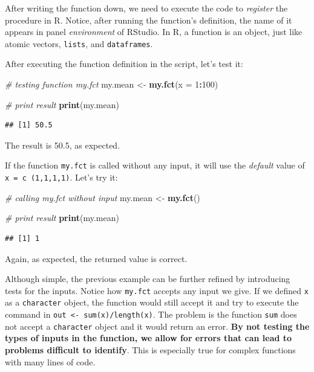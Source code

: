 \documentclass[11pt,]{book}
\newenvironment{Shaded}{\begin{snugshade}}{\end{snugshade}}
\newcommand{\KeywordTok}[1]{\textcolor[rgb]{0.27,0.27,0.27}{\textbf{#1}}}
\newcommand{\DataTypeTok}[1]{\textcolor[rgb]{0.27,0.27,0.27}{#1}}
\newcommand{\DecValTok}[1]{\textcolor[rgb]{0.06,0.06,0.06}{#1}}
\newcommand{\StringTok}[1]{\textcolor[rgb]{0.5,0.5,0.5}{#1}}
\newcommand{\CommentTok}[1]{\textcolor[rgb]{0.56,0.35,0.01}{\textit{#1}}}
\newcommand{\OperatorTok}[1]{\textcolor[rgb]{0.81,0.36,0.00}{\textbf{#1}}}
\newcommand{\NormalTok}[1]{#1}
\begin{document}
After writing the function down, we need to execute the code to
\emph{register} the procedure in R. Notice, after running the function's
definition, the name of it appears in panel \emph{environment} of
RStudio. In R, a function is an object, just like atomic vectors,
\texttt{lists}, and \texttt{dataframes}. 

After executing the function definition in the script, let's test it:

\begin{Shaded}
\begin{Highlighting}[]
\CommentTok{# testing function my.fct}
\NormalTok{my.mean <-}\StringTok{ }\KeywordTok{my.fct}\NormalTok{(}\DataTypeTok{x =} \DecValTok{1}\OperatorTok{:}\DecValTok{100}\NormalTok{)}

\CommentTok{# print result}
\KeywordTok{print}\NormalTok{(my.mean)}
\end{Highlighting}
\end{Shaded}

\begin{verbatim}
## [1] 50.5
\end{verbatim}

The result is 50.5, as expected.

If the function \texttt{my.fct} is called without any input, it will use
the \emph{default} value of \texttt{x\ =\ c\ (1,1,1,1)}. Let's try it:

\begin{Shaded}
\begin{Highlighting}[]
\CommentTok{# calling my.fct without input}
\NormalTok{my.mean <-}\StringTok{ }\KeywordTok{my.fct}\NormalTok{()}

\CommentTok{# print result}
\KeywordTok{print}\NormalTok{(my.mean)}
\end{Highlighting}
\end{Shaded}

\begin{verbatim}
## [1] 1
\end{verbatim}

Again, as expected, the returned value is correct.

Although simple, the previous example can be further refined by
introducing tests for the inputs. Notice how \texttt{my.fct} accepts any
input we give. If we defined \texttt{x} as a \texttt{character} object,
the function would still accept it and try to execute the command in
\texttt{out\ \textless{}-\ sum(x)/length(x)}. The problem is the
function \texttt{sum} does not accept a \texttt{character} object and it
would return an error. \textbf{By not testing the types of inputs in the
function, we allow for errors that can lead to problems difficult to
identify}. This is especially true for complex functions with many lines
of code.
\end{document}

